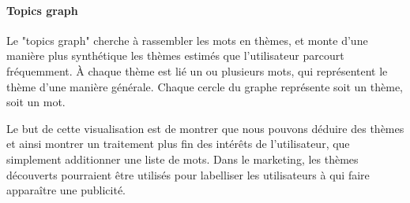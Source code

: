 			\paragraph{Topics graph}

				Le "topics graph" cherche à rassembler les mots en thèmes, et monte d'une manière plus synthétique les thèmes estimés que l'utilisateur parcourt fréquemment. À chaque thème est lié un ou plusieurs mots, qui représentent le thème d'une manière générale. Chaque cercle du graphe représente soit un thème, soit un mot.

				Le but de cette visualisation est de montrer que nous pouvons déduire des thèmes et ainsi montrer un traitement plus fin des intérêts de l'utilisateur, que simplement additionner une liste de mots. Dans le marketing, les thèmes découverts pourraient être utilisés pour labelliser les utilisateurs à qui faire apparaître une publicité.